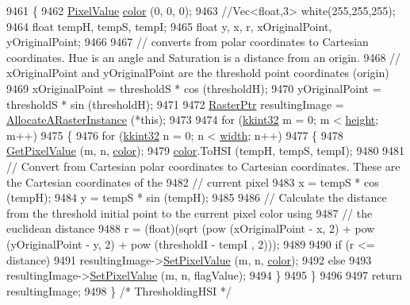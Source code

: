 \begin{DoxyCode}
9461 \{
9462   \hyperlink{class_k_k_b_1_1_pixel_value}{PixelValue} \hyperlink{class_k_k_b_1_1_raster_a482384d89cc53fa4f36276307c746854}{color} (0, 0, 0);
9463   \textcolor{comment}{//Vec<float,3> white(255,255,255);}
9464   \textcolor{keywordtype}{float} tempH, tempS, tempI;
9465   \textcolor{keywordtype}{float} y, x, r, xOriginalPoint, yOriginalPoint;
9466 
9467   \textcolor{comment}{// converts from polar coordinates to Cartesian coordinates. Hue is an angle and Saturation is a distance
       from an origin.}
9468   \textcolor{comment}{// xOriginalPoint and yOriginalPoint are the threshold point coordinates (origin)}
9469   xOriginalPoint = thresholdS * cos (thresholdH);
9470   yOriginalPoint = thresholdS * sin (thresholdH);
9471 
9472   \hyperlink{class_k_k_b_1_1_raster}{RasterPtr}  resultingImage = \hyperlink{class_k_k_b_1_1_raster_aa879980d112c01cb7ad9a3cfc7cd6f64}{AllocateARasterInstance} (*\textcolor{keyword}{this});
9473 
9474   \textcolor{keywordflow}{for}  (\hyperlink{namespace_k_k_b_a8fa4952cc84fda1de4bec1fbdd8d5b1b}{kkint32} m = 0;  m < \hyperlink{class_k_k_b_1_1_raster_af39ff189de4fbb6de98392e187efafb7}{height};  m++)
9475   \{
9476     \textcolor{keywordflow}{for}  (\hyperlink{namespace_k_k_b_a8fa4952cc84fda1de4bec1fbdd8d5b1b}{kkint32} n = 0;  n < \hyperlink{class_k_k_b_1_1_raster_ae0bcc103e191c3421d7692dc69ceb554}{width};  n++)
9477     \{
9478       \hyperlink{class_k_k_b_1_1_raster_aa472a98997466422f24cb5b534cff974}{GetPixelValue} (m, n, \hyperlink{class_k_k_b_1_1_raster_a482384d89cc53fa4f36276307c746854}{color});
9479       \hyperlink{class_k_k_b_1_1_raster_a482384d89cc53fa4f36276307c746854}{color}.ToHSI (tempH, tempS, tempI);
9480 
9481       \textcolor{comment}{// Convert from Cartesian polar coordinates to Cartesian coordinates. These are the Cartesian
       coordinates of the}
9482       \textcolor{comment}{// current pixel}
9483       x = tempS * cos (tempH);
9484       y = tempS * sin (tempH);
9485 
9486       \textcolor{comment}{// Calculate the distance from the threshold initial point to the current pixel color using }
9487       \textcolor{comment}{// the euclidean distance}
9488       r = (float)(sqrt (pow (xOriginalPoint - x, 2) + pow (yOriginalPoint - y, 2) + pow (thresholdI - tempI
      , 2)));
9489 
9490       \textcolor{keywordflow}{if}  (r <= distance)
9491          resultingImage->\hyperlink{class_k_k_b_1_1_raster_a5ddb8bd069dc64241941b0b011af8667}{SetPixelValue} (m, n, \hyperlink{class_k_k_b_1_1_raster_a482384d89cc53fa4f36276307c746854}{color});
9492       \textcolor{keywordflow}{else}
9493         resultingImage->\hyperlink{class_k_k_b_1_1_raster_a5ddb8bd069dc64241941b0b011af8667}{SetPixelValue} (m, n, flagValue);
9494     \}
9495   \}
9496 
9497   \textcolor{keywordflow}{return}  resultingImage;
9498 \}  \textcolor{comment}{/* ThresholdingHSI */}
\end{DoxyCode}
